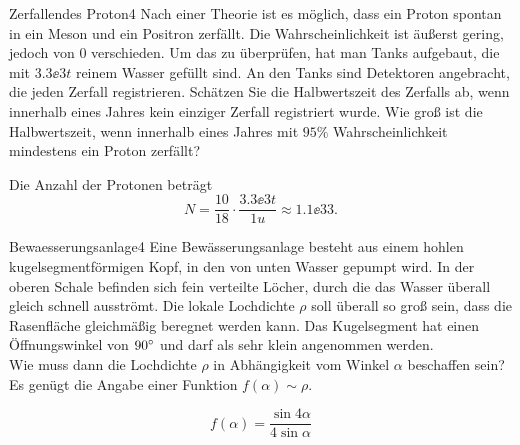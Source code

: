 \begin{problem}{Zerfallendes Proton}{4}
Nach einer Theorie ist es möglich, dass ein Proton spontan in ein Meson und ein Positron zerfällt. Die Wahrscheinlichkeit ist äußerst gering, jedoch von $0$ verschieden. Um das zu überprüfen, hat man Tanks aufgebaut, die mit $3.3\ee{3}\unit{t}$ reinem Wasser gefüllt sind. An den Tanks sind Detektoren angebracht, die jeden Zerfall registrieren. Schätzen Sie die Halbwertszeit des Zerfalls ab, wenn innerhalb eines Jahres kein einziger Zerfall registriert wurde. Wie groß ist die Halbwertszeit, wenn innerhalb eines Jahres mit $95\%$ Wahrscheinlichkeit mindestens ein Proton zerfällt?
\begin{solution}
Die Anzahl der Protonen beträgt
\[
N=\frac{10}{18}\cdot\frac{3.3\ee{3}\unit{t}}{1u}\approx 1.1\ee{33}.
\]
\end{solution}
\end{problem}


\begin{problem}{Bewaesserungsanlage}{4}
Eine Bewässerungsanlage besteht aus einem hohlen kugelsegmentförmigen Kopf, in den von unten Wasser gepumpt wird. In der oberen Schale befinden sich fein verteilte Löcher, durch die das Wasser überall gleich schnell ausströmt. Die lokale Lochdichte $\rho$ soll überall so groß sein, dass die Rasenfläche gleichmäßig beregnet werden kann. Das Kugelsegment hat einen Öffnungswinkel von $90^\circ$ und darf als sehr klein angenommen werden.\\
Wie muss dann die Lochdichte $\rho$ in Abhängigkeit vom Winkel $\alpha$ beschaffen sein? Es genügt die Angabe einer Funktion $f(\alpha)\sim\rho$.
\begin{solution}
\[
f(\alpha)=\frac{\sin{4\alpha}}{4\sin{\alpha}}
\]
\end{solution}
\end{problem}


